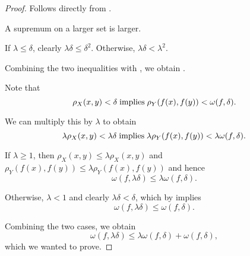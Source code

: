 \begin{proof}
   Follows directly from .

   A supremum on a larger set is larger.

   If \( \lambda \leq \delta \), clearly \( \lambda \delta \leq \delta^2 \). Otherwise, \( \lambda \delta < \lambda^2 \).

  Combining the two inequalities with , we obtain .

   Note that
  \begin{equation*}
    \rho_{X}(x, y) < \delta \T{implies} \rho_{Y}(f(x), f(y)) < \omega(f, \delta).
  \end{equation*}

  We can multiply this by \( \lambda \) to obtain
  \begin{equation*}
    \lambda \rho_{X}(x, y) < \lambda \delta \T{implies} \lambda \rho_{Y}(f(x), f(y)) < \lambda \omega(f, \delta).
  \end{equation*}

  If \( \lambda \geq 1 \), then \( \rho_{X}(x, y) \leq \lambda \rho_{X}(x, y) \) and \( \rho_{Y}(f(x), f(y)) \leq \lambda \rho_{Y}(f(x), f(y)) \) and hence
  \begin{equation*}
    \omega(f, \lambda \delta) \leq \lambda \omega(f, \delta).
  \end{equation*}

  Otherwise, \( \lambda < 1 \) and clearly \( \lambda \delta < \delta \), which by  implies
  \begin{equation*}
    \omega(f, \lambda \delta) \leq \omega(f, \delta).
  \end{equation*}

  Combining the two cases, we obtain
  \begin{equation*}
    \omega(f, \lambda \delta) \leq \lambda \omega(f, \delta) + \omega(f, \delta),
  \end{equation*}
  which we wanted to prove.
\end{proof}
